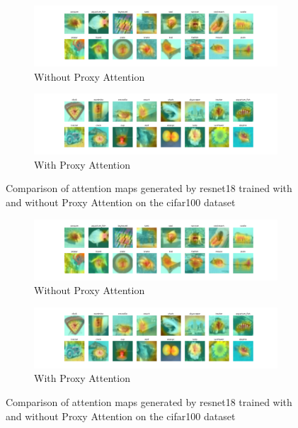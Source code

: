 
    \begin{figure}[H]
        \centering
        \begin{subfigure}[b]{1\textwidth}
            \includegraphics[width=\textwidth]{images/cifar100_resnet18_noproxy_0.pdf}
            \caption{Without Proxy Attention}
        \end{subfigure}
        \hfill
        \begin{subfigure}[b]{1\textwidth}
            \includegraphics[width=\textwidth]{images/cifar100_resnet18_proxy_0.pdf}
            \caption{With Proxy Attention}
        \end{subfigure}
        \caption{Comparison of attention maps generated by resnet18 trained with and without Proxy Attention on the cifar100 dataset}
    \end{figure}
    

    \begin{figure}[H]
        \centering
        \begin{subfigure}[b]{1\textwidth}
            \includegraphics[width=\textwidth]{images/cifar100_resnet18_noproxy_0.pdf}
            \caption{Without Proxy Attention}
        \end{subfigure}
        \hfill
        \begin{subfigure}[b]{1\textwidth}
            \includegraphics[width=\textwidth]{images/cifar100_resnet18_proxy_0.pdf}
            \caption{With Proxy Attention}
        \end{subfigure}
        \caption{Comparison of attention maps generated by resnet18 trained with and without Proxy Attention on the cifar100 dataset}
    \end{figure}
    

